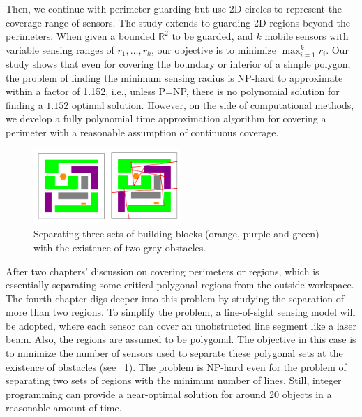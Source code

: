 Then, we continue with perimeter guarding but use 2D circles to represent the 
coverage range of sensors. The study extends to guarding 2D regions beyond the perimeters. 
When given a bounded $\mathbb R^2$ to be guarded, and $k$ mobile sensors with variable sensing ranges of $r_1,\dots,r_k$, 
our objective is to minimize $\max_{i=1}^{k} r_i$.
Our study shows that even for covering the boundary or interior of a simple polygon, 
the problem of finding the minimum sensing radius is NP-hard to approximate within a factor of 1.152, i.e.,
unless P=NP, there is no polynomial solution for finding a $1.152$ optimal solution. 
However, on the side of computational methods, we develop a fully polynomial time approximation algorithm for covering
a perimeter with a reasonable assumption of continuous coverage.


\begin{figure}[h]
    \centering
    \includegraphics[width = 0.5\textwidth]{chapters/bf/fig/intro_pic.png}
    \caption[Separating three sets of building blocks with the existence of two obstacles]{Separating three sets of building blocks (orange, purple and green) with the existence of two grey obstacles.}
    \label{fig:intro-lines}
\end{figure}


After two chapters' discussion on covering perimeters or regions, which is essentially separating 
some critical polygonal regions from the outside workspace. 
The fourth chapter digs deeper into this problem by studying the separation of more than two regions. 
To simplify the problem, a line-of-sight sensing model will be adopted, where each sensor can cover
an unobstructed line segment like a laser beam. Also, the regions are assumed to be polygonal.
The objective in this case is to minimize the number of sensors used to separate these polygonal sets 
at the existence of obstacles (see ~\ref{fig:intro-lines}).
The problem is NP-hard even for the problem of separating two sets of regions with the minimum number of lines. 
Still, integer programming can provide a near-optimal solution for around 20 objects in a reasonable amount of time. 


